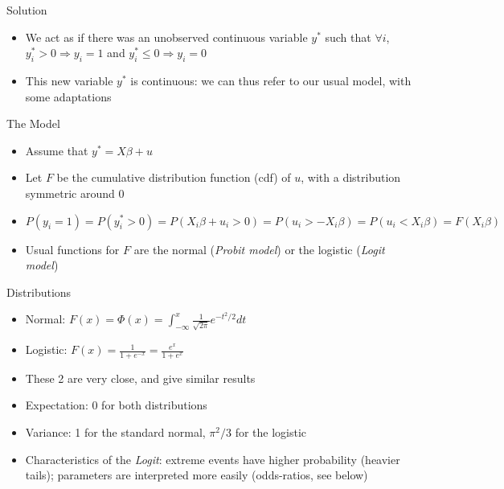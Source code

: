 \documentclass[aspectratio=169]{beamer}
\begin{document}
\begin{frame}{Solution}
\begin{itemize}
    \item We act as if there was an unobserved continuous variable $y^*$ such that $\forall i$, $y_i^* > 0 \Rightarrow y_i = 1$ and $y_i^* \leq 0 \Rightarrow y_i = 0$
    \item This new variable $y^*$ is continuous: we can thus refer to our usual model, with some adaptations
\end{itemize}
\end{frame}

\begin{frame}{The Model}
\begin{itemize}
    \item Assume that $y^* = X\beta + u$
    \item Let $F$ be the cumulative distribution function (cdf) of $u$, with a distribution symmetric around 0
    \item $P(y_i = 1) = P(y_i^* > 0) = P(X_i\beta + u_i > 0) = P(u_i > -X_i\beta) = P(u_i < X_i\beta) = F(X_i\beta)$
    \item Usual functions for $F$ are the normal (\textit{Probit model}) or the logistic (\textit{Logit model})
\end{itemize}
\end{frame}

\begin{frame}{Distributions}
\begin{itemize}
    \item Normal: $F(x) = \Phi(x) = \int_{-\infty}^{x} \frac{1}{\sqrt{2\pi}}e^{-t^2/2}dt$
    \item Logistic: $F(x) = \frac{1}{1+e^{-x}} = \frac{e^x}{1+e^x}$
    \item These 2 are very close, and give similar results
    \item Expectation: 0 for both distributions
    \item Variance: 1 for the standard normal, $\pi^2/3$ for the logistic
    \item Characteristics of the \textit{Logit}: extreme events have higher probability (heavier tails); parameters are interpreted more easily (odds-ratios, see below)
\end{itemize}
\end{frame}
\end{document}

